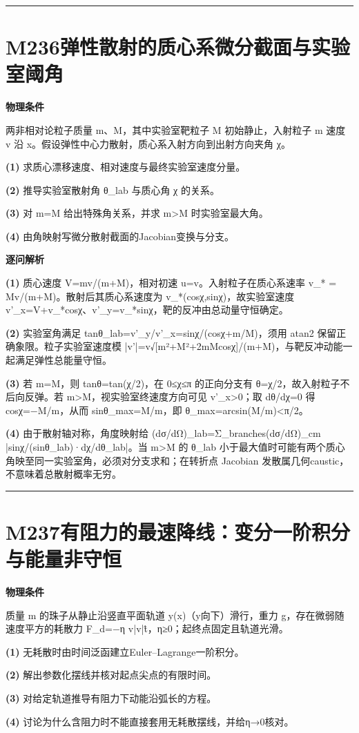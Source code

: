 \documentclass[UTF8,a4paper,11pt,oneside,openany]{ctexbook}
\begin{document}
\par\bigskip\hrule\bigskip
\section*{M236\quad 弹性散射的质心系微分截面与实验室阈角}
\textbf{物理条件}\par 两非相对论粒子质量 m、M，其中实验室靶粒子 M 初始静止，入射粒子 m 速度 v 沿 x。假设弹性中心力散射，质心系入射方向到出射方向夹角 χ。
\par\noindent\textbf{(1)} 求质心漂移速度、相对速度与最终实验室速度分量。
\par\noindent\textbf{(2)} 推导实验室散射角 θ\_lab 与质心角 χ 的关系。
\par\noindent\textbf{(3)} 对 m=M 给出特殊角关系，并求 m>M 时实验室最大角。
\par\noindent\textbf{(4)} 由角映射写微分散射截面的Jacobian变换与分支。

\par\medskip\noindent\textbf{逐问解析}
\par\noindent\textbf{(1)} 质心速度 V=mv/(m+M)，相对初速 u=v。入射粒子在质心系速率 v\_* = Mv/(m+M)。散射后其质心系速度为 v\_*(cosχ,sinχ)，故实验室速度 v'\_x=V+v\_*cosχ、v'\_y=v\_*sinχ，靶的反冲由总动量守恒确定。
\par\noindent\textbf{(2)} 实验室角满足 tanθ\_lab=v'\_y/v'\_x=sinχ/(cosχ+m/M)，须用 atan2 保留正确象限。粒子实验室速度模 |v'|=v√[m²+M²+2mMcosχ]/(m+M)，与靶反冲动能一起满足弹性总能量守恒。
\par\noindent\textbf{(3)} 若 m=M，则 tanθ=tan(χ/2)，在 0≤χ≤π 的正向分支有 θ=χ/2，故入射粒子不后向反弹。若 m>M，视实验室终速度方向可见 v'\_x>0；取 dθ/dχ=0 得 cosχ=−M/m，从而 sinθ\_max=M/m，即 θ\_max=arcsin(M/m)<π/2。
\par\noindent\textbf{(4)} 由于散射轴对称，角度映射给 (dσ/dΩ)\_lab=Σ\_branches(dσ/dΩ)\_cm |sinχ/(sinθ\_lab)·dχ/dθ\_lab|。当 m>M 的 θ\_lab 小于最大值时可能有两个质心角映至同一实验室角，必须对分支求和；在转折点 Jacobian 发散属几何caustic，不意味着总散射概率无穷。

\par\bigskip\hrule\bigskip
\section*{M237\quad 有阻力的最速降线：变分一阶积分与能量非守恒}
\textbf{物理条件}\par 质量 m 的珠子从静止沿竖直平面轨道 y(x)（y向下）滑行，重力 g，存在微弱随速度平方的耗散力 F\_d=−η v|v|t̂，η≥0；起终点固定且轨道光滑。
\par\noindent\textbf{(1)} 无耗散时由时间泛函建立Euler–Lagrange一阶积分。
\par\noindent\textbf{(2)} 解出参数化摆线并核对起点尖点的有限时间。
\par\noindent\textbf{(3)} 对给定轨道推导有阻力下动能沿弧长的方程。
\par\noindent\textbf{(4)} 讨论为什么含阻力时不能直接套用无耗散摆线，并给η→0核对。
\end{document}
